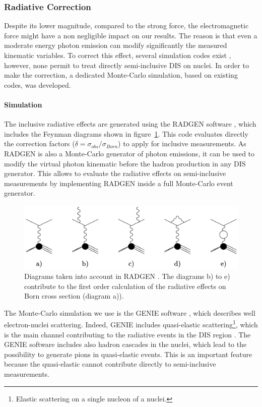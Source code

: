 \subsubsection{Radiative Correction}
\label{RadCor}

Despite its lower magnitude, compared to the strong force, the 
electromagnetic force might have a non negligible impact on our results. The 
reason is that even a moderate energy photon 
emission can modify significantly the measured kinematic variables.
To correct this effect, several simulation codes exist \cite{Akushevich:2001yp}, 
however, none permit to treat directly semi-inclusive DIS on nuclei. In order 
to make the correction, a dedicated Monte-Carlo simulation, based on existing 
codes, was developed.

\paragraph{Simulation}

The inclusive radiative effects are generated using the RADGEN software 
\cite{Akushevich:1998ft}, which includes the Feynman diagrams shown in 
figure~\ref{fig:FDRadCorr}. This code evaluates directly the correction 
factors ($\delta = \sigma_{obs} / \sigma_{Born}$) to apply for inclusive 
measurements. As RADGEN is also a Monte-Carlo generator of photon emissions, 
it can be used to modify the virtual photon kinematic before the 
hadron production in any DIS generator. This allows to evaluate the radiative 
effects on semi-inclusive measurements by implementing RADGEN inside a full 
Monte-Carlo event generator.

\begin{figure}[htbp]
\centering
\includegraphics[width=12cm] {chap5-fig/RadDiag.png}
\caption {Diagrams taken into account in RADGEN \cite{Akushevich:1998ft}. The 
diagrams b) to e) contribute to the first order calculation of the radiative 
effects on Born cross section (diagram a)).}
\label{fig:FDRadCorr}
\end{figure}

The Monte-Carlo simulation we use is the GENIE software 
\cite{Andreopoulos:2009rq}, which describes well electron-nuclei scattering. 
Indeed, GENIE includes quasi-elastic scattering\footnote{Elastic 
scattering on a single nucleon of a nuclei.}, which is the main channel contributing 
to the radiative events in the DIS region \cite{Akushevich:2007jc}. The GENIE 
software includes also hadron cascades in the nuclei, which lead to the 
possibility to generate pions in quasi-elastic events. This is an important 
feature because the quasi-elastic cannot contribute directly to semi-inclusive 
measurements.

